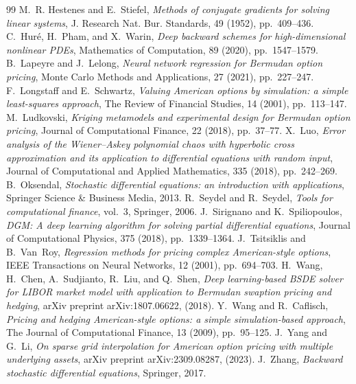 \documentclass[10pt,a4paper]{amsart}
\numberwithin{equation}{section}
\numberwithin{algorithm}{section}
\theoremstyle{plain}
\theoremstyle{remark}
\begin{document}
\begin{thebibliography}{99}
 {\sc M.~R. Hestenes and E.~Stiefel}, {\em Methods of conjugate gradients for solving linear systems}, J. Research Nat. Bur. Standards, 49 (1952), pp.~409--436.
 {\sc C.~Hur{\'e}, H.~Pham, and X.~Warin}, {\em Deep backward schemes for high-dimensional nonlinear {PDE}s}, Mathematics of Computation, 89 (2020), pp.~1547--1579.
 {\sc B.~Lapeyre and J.~Lelong}, {\em Neural network regression for {B}ermudan option pricing}, Monte Carlo Methods and Applications, 27 (2021), pp.~227--247.
 {\sc F.~Longstaff and E.~Schwartz}, {\em Valuing {A}merican options by simulation: a simple least-squares approach}, The Review of Financial Studies, 14 (2001), pp.~113--147.
 {\sc M.~Ludkovski}, {\em Kriging metamodels and experimental design for {B}ermudan option pricing}, Journal of Computational Finance, 22 (2018), pp.~37--77.
 {\sc X.~Luo}, {\em Error analysis of the {W}iener--{A}skey polynomial chaos with hyperbolic cross approximation and its application to differential equations with random input}, Journal of Computational and Applied Mathematics, 335 (2018), pp.~242--269.
 {\sc B.~Oksendal}, {\em Stochastic differential equations: an introduction with applications}, Springer Science \& Business Media, 2013.
 {\sc R.~Seydel and R.~Seydel}, {\em Tools for computational finance}, vol.~3, Springer, 2006.
 {\sc J.~Sirignano and K.~Spiliopoulos}, {\em {DGM}: A deep learning algorithm for solving partial differential equations}, Journal of Computational Physics, 375 (2018), pp.~1339--1364.
 {\sc J.~Tsitsiklis and B.~Van~Roy}, {\em Regression methods for pricing complex {A}merican-style options}, IEEE Transactions on Neural Networks, 12 (2001), pp.~694--703.
 {\sc H.~Wang, H.~Chen, A.~Sudjianto, R.~Liu, and Q.~Shen}, {\em Deep learning-based {BSDE} solver for {LIBOR} market model with application to {B}ermudan swaption pricing and hedging}, arXiv preprint arXiv:1807.06622, (2018).
 {\sc Y.~Wang and R.~Caflisch}, {\em Pricing and hedging {A}merican-style options: a simple simulation-based approach}, The Journal of Computational Finance, 13 (2009), pp.~95--125.
 {\sc J.~Yang and G.~Li}, {\em On sparse grid interpolation for {A}merican option pricing with multiple underlying assets}, arXiv preprint arXiv:2309.08287, (2023).
 {\sc J.~Zhang}, {\em Backward stochastic differential equations}, Springer, 2017.
\end{thebibliography}
\end{document}
